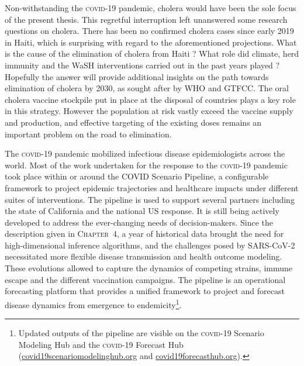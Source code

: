 Non-withstanding the \textsc{covid}-19 pandemic, cholera would have been the sole focus of the present thesis. This regretful interruption left unanswered some research questions on cholera. There has been no confirmed cholera cases since early 2019 in Haiti, which is surprising with regard to the aforementioned projections. What is the cause of the elimination of cholera from Haiti ? What role did climate, herd immunity and the WaSH interventions carried out in the past years played\cite{Rebaudet:CaseareaTargetedRapid:2019} ? Hopefully the answer will provide additional insights on the path towards elimination of cholera by 2030, as sought after by WHO and GTFCC. The oral cholera vaccine stockpile put in place at the disposal of countries plays a key role in this strategy\cite[-2\baselineskip]{GlobalTaskForceonCholeraControl:EndingCholeraGlobal:2017}. However the population at risk vastly exceed the vaccine supply and production\cite{Pezzoli:GlobalOralCholera:2019}, and effective targeting of the existing doses remains an important problem\cite{Lessler:MappingBurdenCholera:2018} on the road to elimination.

The \textsc{covid-19} pandemic mobilized infectious disease epidemiologists across the world. Most of the work undertaken for the response to the \textsc{covid}-19 pandemic took place within or around the COVID Scenario Pipeline, a configurable framework to project epidemic trajectories and healthcare impacts under different suites of interventions. The pipeline is used to support several partners including the state of California and the national US response. It is still being actively developed to address the ever-changing needs of decision-makers. Since the description given in \textsc{Chapter~4}, a year of historical data brought the need for high-dimensional inference algorithms, and the challenges posed by SARS-CoV-2 necessitated more flexible disease transmission and health outcome modeling. These evolutions allowed to capture the dynamics of competing strains, immune escape and the different vaccination campaigns\cite{Borchering:ModelingFutureCOVID19:2021}. The pipeline is an operational forecasting platform that provides a unified framework to project and forecast disease dynamics from emergence to endemicity\footnote{Updated outputs of the pipeline are visible on the \textsc{covid}-19 Scenario Modeling Hub and the \textsc{covid}-19 Forecast Hub (\url{covid19scenariomodelinghub.org} and \url{covid19forecasthub.org}).}.

